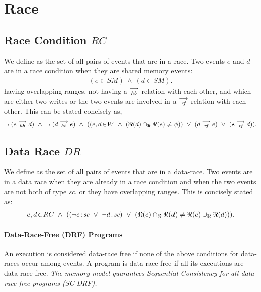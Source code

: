     \section{Race}
        
        \subsection{Race Condition $RC$} 
            We define  as the set of all pairs of events that are in a race. Two events $e$ and $d$ are in a race condition when they are shared memory events:
            \begin{align*}
                (e \in SM)\ \wedge\ (d \in SM).
            \end{align*}
            having overlapping ranges, not having a $\stackrel{\longrightarrow}{_\textit{hb}}$ relation with each other, and which are either two writes or the two events are involved in a $\stackrel{\longrightarrow}{_\textit{rf}}$ relation with each other. This can be stated concisely as,
            \begin{align*}
                \neg \ (\reln{e}{hb}{d})\ \wedge\ \neg \ (\reln{d}{hb}{e}) 
                \ \wedge \ 
                (
                (\event{e,d}{W}\  \wedge\ (\Re(d) \cap_{\Re} \Re(e) \neq \phi)) 
                    \  \vee\ (d \stck{_\textit{rf}} e)\ \vee\ (e \stck{_\textit{rf}} d)
                ).
            \end{align*}
                    
        \subsection{Data Race $DR$} 
            We define  as the set of all pairs of events that are in a data-race. Two events are in a data race when they are already in a race condition and when the two events are not both of type \textit{sc}, or they have overlapping ranges. This is concisely stated as:  
            \begin{align*}
                \event{e,d}{RC}  \ \wedge \ 
                ((\neg\et{e}{sc} \ \vee \ \neg\et{d}{sc}) \ \vee \ 
                (\Re(e) \cap_{\Re} \Re(d) \neq \Re(e) \cup_{\Re} \Re(d))). 
            \end{align*}
            
        
        \paragraph{Data-Race-Free (DRF) Programs}
            An execution is considered data-race free if none of the above conditions for data-races occur among events. A program is data-race free if all its executions are data race free.          
            \textit{The memory model guarantees Sequential Consistency for all data-race free programs (SC-DRF).}
        